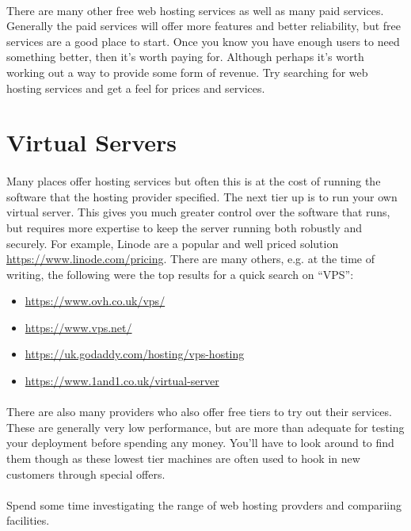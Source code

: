 \documentclass[10pt, a4paper, twosize]{article}
\begin{document}
\paragraph{} There are many other free web hosting services as well as many paid services. Generally the paid services will offer more features and better reliability, but free services are a good place to start. Once you know you have enough users to need something better, then it's worth paying for. Although perhaps it's worth working out a way to provide some form of revenue. Try searching for web hosting services and get a feel for prices and services.

\section{Virtual Servers}
\paragraph{} Many places offer hosting services but often this is at the cost of running the software that the hosting provider specified. The next tier up is to run your own virtual server. This gives you much greater control over the software that runs, but requires more expertise to keep the server running both robustly and securely. For example, Linode are a popular and well priced solution \url{https://www.linode.com/pricing}. There are many others, e.g. at the time of writing, the following were the top results for a quick search on ``VPS'':

\begin{itemize}
\item \url{https://www.ovh.co.uk/vps/}
\item \url{https://www.vps.net/}
\item \url{https://uk.godaddy.com/hosting/vps-hosting}
\item \url{https://www.1and1.co.uk/virtual-server}
\end{itemize}

\paragraph{} There are also many providers who also offer free tiers to try out their services. These are generally very low performance, but are more than adequate for testing your deployment before spending any money.  You'll have to look around to find them though as these lowest tier machines are often used to hook in new customers through special offers.

\paragraph{} Spend some time investigating the range of web hosting provders and compariing facilities.
\end{document}
